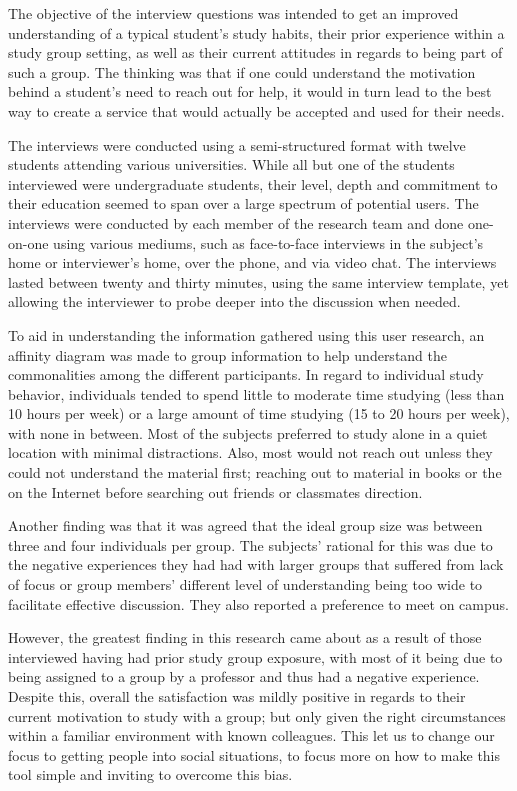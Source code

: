 \documentclass{sigchi-ext}
\begin{document}
The objective of the interview questions was intended to get an improved
understanding of a typical student's study habits, their prior experience
within a study group setting, as well as their current attitudes in regards
to being part of such a group. The thinking was that if one could
understand the motivation behind a student's need to reach out for help, it
would in turn lead to the best way to create a service that would actually
be accepted and used for their needs.

The interviews were conducted using a semi-structured format with twelve
students attending various universities. While all but one of the students
interviewed were undergraduate students, their level, depth and commitment
to their education seemed to span over a large spectrum of potential users.
The interviews were conducted by each member of the research team and done
one-on-one using various mediums, such as face-to-face interviews in the
subject's home or interviewer's home, over the phone, and via video chat.
The interviews lasted between twenty and thirty minutes, using the same
interview template, yet allowing the interviewer to probe deeper into the
discussion when needed.

To aid in understanding the information gathered using this user research,
an affinity diagram was made to group information to help understand the
commonalities among the different participants. In regard to individual
study behavior, individuals tended to spend little to moderate time
studying (less than 10 hours per week) or a large amount of time studying
(15 to 20 hours per week), with none in between. Most of the subjects
preferred to study alone in a quiet location with minimal distractions.
Also, most would not reach out unless they could not understand the
material first; reaching out to material in books or the on the Internet
before searching out friends or classmates direction.

Another finding was that it was agreed that the ideal group size was
between three and four individuals per group. The subjects' rational for
this was due to the negative experiences they had had with larger groups
that suffered from lack of focus or group members' different level of
understanding being too wide to facilitate effective discussion. They also
reported a preference to meet on campus.

However, the greatest finding in this research came about as a result of
those interviewed having had prior study group exposure, with most of it
being due to being assigned to a group by a professor and thus had a
negative experience. Despite this, overall the satisfaction was mildly
positive in regards to their current motivation to study with a group; but
only given the right circumstances within a familiar environment with known
colleagues. This let us to change our focus to getting people into social
situations, to focus more on how to make this tool simple and inviting to
overcome this bias.
\end{document}
